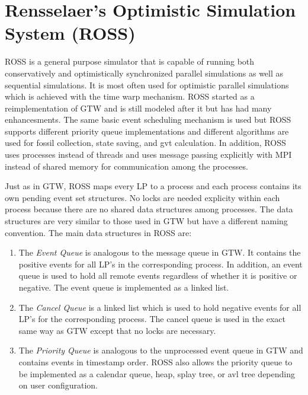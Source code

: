 \documentclass[11pt]{book}
\begin{document}
\section{Rensselaer's Optimistic Simulation System (ROSS)}

ROSS\cite{carothers-00} is a general purpose simulator that is capable of running both
conservatively and optimistically synchronized parallel simulations as well as sequential
simulations. It is most often used for optimistic parallel simulations which is achieved
with the time warp mechanism. ROSS started as a reimplementation of GTW and is still
modeled after it but has had many enhancesments. The same basic event scheduling mechanism is
used but ROSS supports different priority queue implementations and different algorithms
are used for fossil collection, state saving, and gvt calculation. In addition, ROSS uses
processes instead of threads and uses message passing explicitly with MPI instead of shared
memory for communication among the processes.

Just as in GTW, ROSS maps every LP to a process and each process contains its own pending
event set structures. No locks are needed explicity within each process because there are
no shared data structures among processes. The data structures are very similar to those
used in GTW but have a different naming convention. The main data structures in ROSS are:

\begin{enumerate}
    \item The \emph{Event Queue} is analogous to the message queue in GTW. It contains the
        positive events for all LP's in the corresponding process. In addition, an event
        queue is used to hold all remote events regardless of whether it is positive or
        negative. The event queue is implemented as a linked list.
    \item The \emph{Cancel Queue} is a linked list which is used to hold negative events
        for all LP's for the corresponding process. The cancel queue is used in the exact
        same way as GTW except that no locks are necessary.
    \item The \emph{Priority Queue} is analogous to the unprocessed event queue in GTW and
        contains events in timestamp order. ROSS also allows the priority queue to be
        implemented as a calendar queue, heap, splay tree, or avl tree depending on user
        configuration.
\end{enumerate}
\end{document}

